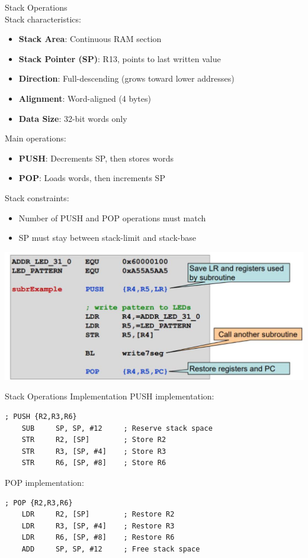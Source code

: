 \begin{definition}{Stack Operations}\\
Stack characteristics:
\begin{itemize}
  \item \textbf{Stack Area}: Continuous RAM section
  \item \textbf{Stack Pointer (SP)}: R13, points to last written value
  \item \textbf{Direction}: Full-descending (grows toward lower addresses)
  \item \textbf{Alignment}: Word-aligned (4 bytes)
  \item \textbf{Data Size}: 32-bit words only
\end{itemize}

Main operations:
\begin{itemize}
  \item \textbf{PUSH}: Decrements SP, then stores words
  \item \textbf{POP}: Loads words, then increments SP
\end{itemize}

Stack constraints:
\begin{itemize}
  \item Number of PUSH and POP operations must match
  \item SP must stay between stack-limit and stack-base
\end{itemize}

\includegraphics[width=\linewidth]{images/2024_12_29_79e6b22f503fb7b4f718g-08}
\end{definition}

\begin{example2}{Stack Operations Implementation}
PUSH implementation:
\begin{lstlisting}[language=armasm, style=basesmol]
    ; PUSH {R2,R3,R6}
    SUB     SP, SP, #12     ; Reserve stack space
    STR     R2, [SP]        ; Store R2
    STR     R3, [SP, #4]    ; Store R3
    STR     R6, [SP, #8]    ; Store R6
\end{lstlisting}

POP implementation:
\begin{lstlisting}[language=armasm, style=basesmol]
    ; POP {R2,R3,R6}
    LDR     R2, [SP]        ; Restore R2
    LDR     R3, [SP, #4]    ; Restore R3
    LDR     R6, [SP, #8]    ; Restore R6
    ADD     SP, SP, #12     ; Free stack space
\end{lstlisting}
\end{example2}

